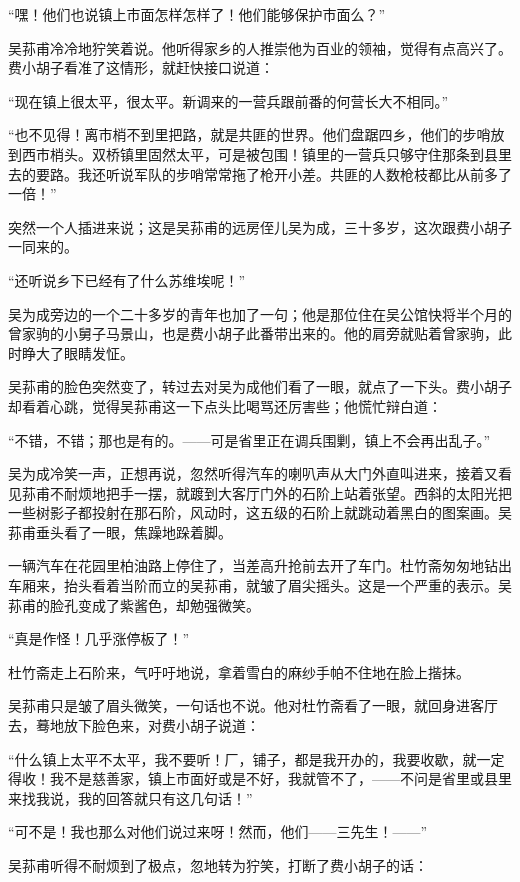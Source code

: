 \par “嘿！他们也说镇上市面怎样怎样了！他们能够保护市面么？”
\par 吴荪甫冷冷地狞笑着说。他听得家乡的人推崇他为百业的领袖，觉得有点高兴了。费小胡子看准了这情形，就赶快接口说道：
\par “现在镇上很太平，很太平。新调来的一营兵跟前番的何营长大不相同。”
\par “也不见得！离市梢不到里把路，就是共匪的世界。他们盘踞四乡，他们的步哨放到西市梢头。双桥镇里固然太平，可是被包围！镇里的一营兵只够守住那条到县里去的要路。我还听说军队的步哨常常拖了枪开小差。共匪的人数枪枝都比从前多了一倍！”
\par 突然一个人插进来说；这是吴荪甫的远房侄儿吴为成，三十多岁，这次跟费小胡子一同来的。
\par “还听说乡下已经有了什么苏维埃呢！”
\par 吴为成旁边的一个二十多岁的青年也加了一句；他是那位住在吴公馆快将半个月的曾家驹的小舅子马景山，也是费小胡子此番带出来的。他的肩旁就贴着曾家驹，此时睁大了眼睛发怔。
\par 吴荪甫的脸色突然变了，转过去对吴为成他们看了一眼，就点了一下头。费小胡子却看着心跳，觉得吴荪甫这一下点头比喝骂还厉害些；他慌忙辩白道：
\par “不错，不错；那也是有的。——可是省里正在调兵围剿，镇上不会再出乱子。”
\par 吴为成冷笑一声，正想再说，忽然听得汽车的喇叭声从大门外直叫进来，接着又看见荪甫不耐烦地把手一摆，就踱到大客厅门外的石阶上站着张望。西斜的太阳光把一些树影子都投射在那石阶，风动时，这五级的石阶上就跳动着黑白的图案画。吴荪甫垂头看了一眼，焦躁地跺着脚。
\par 一辆汽车在花园里柏油路上停住了，当差高升抢前去开了车门。杜竹斋匆匆地钻出车厢来，抬头看着当阶而立的吴荪甫，就皱了眉尖摇头。这是一个严重的表示。吴荪甫的脸孔变成了紫酱色，却勉强微笑。
\par “真是作怪！几乎涨停板了！”
\par 杜竹斋走上石阶来，气吁吁地说，拿着雪白的麻纱手帕不住地在脸上揩抹。
\par 吴荪甫只是皱了眉头微笑，一句话也不说。他对杜竹斋看了一眼，就回身进客厅去，蓦地放下脸色来，对费小胡子说道：
\par “什么镇上太平不太平，我不要听！厂，铺子，都是我开办的，我要收歇，就一定得收！我不是慈善家，镇上市面好或是不好，我就管不了，——不问是省里或县里来找我说，我的回答就只有这几句话！”
\par “可不是！我也那么对他们说过来呀！然而，他们——三先生！——”
\par 吴荪甫听得不耐烦到了极点，忽地转为狞笑，打断了费小胡子的话：
